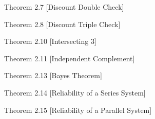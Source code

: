 \documentclass{exam}
\begin{document}
\begin{questions}
\newpage

\question
Theorem 2.7 [Discount Double Check]

\question
Theorem 2.8 [Discount Triple Check]

\question
Theorem 2.10 [Intersecting 3]

\newpage

\question
Theorem 2.11 [Independent Complement]

\question
Theorem 2.13 [Bayes Theorem]

\question
Theorem 2.14 [Reliability of a Series System]

\question
Theorem 2.15 [Reliability of a Parallel System]

\end{questions}
\end{document}
